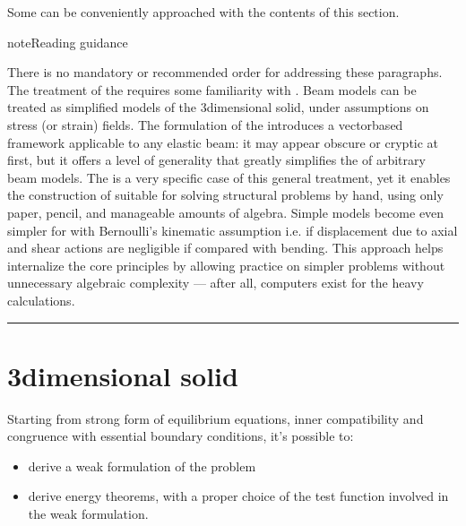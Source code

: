 \documentclass[letterpaper,10pt,english]{jupyterBook}
\begin{document}
\sphinxAtStartPar
{} Some {\hyperref[\detokenize{ch/solids/beams/problems:solid-mechanics-small-displacements-beams-problems}]{}} can be conveniently approached with the contents of this  section.



\begin{sphinxadmonition}{note}{Reading guidance}

\sphinxAtStartPar
There is no mandatory or recommended order for addressing these paragraphs. The treatment of the  requires some familiarity with . Beam models can be treated as simplified models of the 3\sphinxhyphen{}dimensional solid, under assumptions on stress (or strain) fields. The formulation of the  introduces a vector\sphinxhyphen{}based framework applicable to any elastic beam: it may appear obscure or cryptic at first, but it offers a level of generality that greatly simplifies the  of arbitrary beam models. The  is a very specific case of this general treatment, yet it enables the construction of  suitable for solving structural problems by hand, using only paper, pencil, and manageable amounts of algebra. Simple models become even simpler for {\hyperref[\detokenize{ch/solids/beams/slender:solid-mechanics-small-displacements-beams-slender}]{}} with Bernoulli’s kinematic assumption \sphinxhyphen{} i.e. if displacement due to axial and shear actions are negligible if compared with bending. This approach helps internalize the core principles by allowing practice on simpler problems without unnecessary algebraic complexity — after all, computers exist for the heavy calculations.
\end{sphinxadmonition}


\bigskip\hrule\bigskip


\sphinxstepscope


\section{3\sphinxhyphen{}dimensional solid}
\label{\detokenize{ch/solids/small-displacements-statics-weak-form-3d:dimensional-solid}}\label{\detokenize{ch/solids/small-displacements-statics-weak-form-3d:solid-mechanics-intro-small-displacements-statics-weak-form-3d}}\label{\detokenize{ch/solids/small-displacements-statics-weak-form-3d::doc}}
\sphinxAtStartPar
Starting from strong form of equilibrium equations, inner compatibility and congruence with essential boundary conditions, it’s possible to:
\begin{itemize}
\item {} 
\sphinxAtStartPar
derive a weak formulation of the problem

\item {} 
\sphinxAtStartPar
derive energy theorems, with a proper choice of the test function involved in the weak formulation.

\end{itemize}
\end{document}
